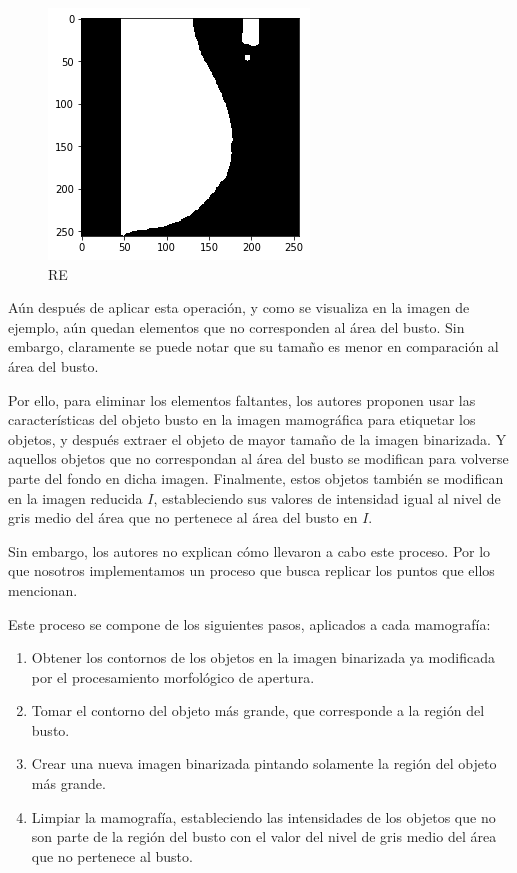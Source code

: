 \documentclass[
]{article}
\providecommand{\tightlist}{%
  \setlength{\itemsep}{0pt}\setlength{\parskip}{0pt}}
\begin{document}
\begin{figure}
\centering
\includegraphics{img/tarea_2_4.png}
\caption{RE}
\end{figure}

Aún después de aplicar esta operación, y como se visualiza en la imagen
de ejemplo, aún quedan elementos que no corresponden al área del busto.
Sin embargo, claramente se puede notar que su tamaño es menor en
comparación al área del busto.

Por ello, para eliminar los elementos faltantes, los autores proponen
usar las características del objeto busto en la imagen mamográfica para
etiquetar los objetos, y después extraer el objeto de mayor tamaño de la
imagen binarizada. Y aquellos objetos que no correspondan al área del
busto se modifican para volverse parte del fondo en dicha imagen.
Finalmente, estos objetos también se modifican en la imagen reducida
\(I\), estableciendo sus valores de intensidad igual al nivel de gris
medio del área que no pertenece al área del busto en \(I\).

Sin embargo, los autores no explican cómo llevaron a cabo este proceso.
Por lo que nosotros implementamos un proceso que busca replicar los
puntos que ellos mencionan.

Este proceso se compone de los siguientes pasos, aplicados a cada
mamografía:

\begin{enumerate}
\def\labelenumi{\arabic{enumi}.}
\tightlist
\item
  Obtener los contornos de los objetos en la imagen binarizada ya
  modificada por el procesamiento morfológico de apertura.
\item
  Tomar el contorno del objeto más grande, que corresponde a la región
  del busto.
\item
  Crear una nueva imagen binarizada pintando solamente la región del
  objeto más grande.
\item
  Limpiar la mamografía, estableciendo las intensidades de los objetos
  que no son parte de la región del busto con el valor del nivel de gris
  medio del área que no pertenece al busto.
\end{enumerate}
\end{document}
